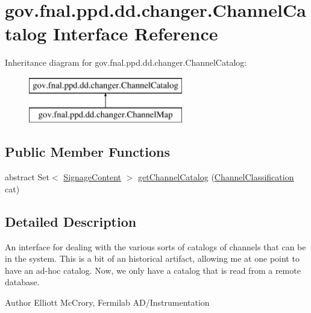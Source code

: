 \hypertarget{interfacegov_1_1fnal_1_1ppd_1_1dd_1_1changer_1_1ChannelCatalog}{\section{gov.\-fnal.\-ppd.\-dd.\-changer.\-Channel\-Catalog Interface Reference}
\label{interfacegov_1_1fnal_1_1ppd_1_1dd_1_1changer_1_1ChannelCatalog}
}
Inheritance diagram for gov.\-fnal.\-ppd.\-dd.\-changer.\-Channel\-Catalog\-:\begin{figure}[H]
\begin{center}
\leavevmode
\includegraphics[height=2.000000cm]{interfacegov_1_1fnal_1_1ppd_1_1dd_1_1changer_1_1ChannelCatalog}
\end{center}
\end{figure}
\subsection*{Public Member Functions}
\begin{DoxyCompactItemize}
\item 
abstract Set$<$ \hyperlink{interfacegov_1_1fnal_1_1ppd_1_1dd_1_1signage_1_1SignageContent}{Signage\-Content} $>$ \hyperlink{interfacegov_1_1fnal_1_1ppd_1_1dd_1_1changer_1_1ChannelCatalog_afa94549b979299708605d160be60ca35}{get\-Channel\-Catalog} (\hyperlink{classgov_1_1fnal_1_1ppd_1_1dd_1_1changer_1_1ChannelClassification}{Channel\-Classification} cat)
\end{DoxyCompactItemize}


\subsection{Detailed Description}
An interface for dealing with the various sorts of catalogs of channels that can be in the system. This is a bit of an historical artifact, allowing me at one point to have an ad-\/hoc catalog. Now, we only have a catalog that is read from a remote database.

\begin{DoxyAuthor}{Author}
Elliott Mc\-Crory, Fermilab A\-D/\-Instrumentation 
\end{DoxyAuthor}


